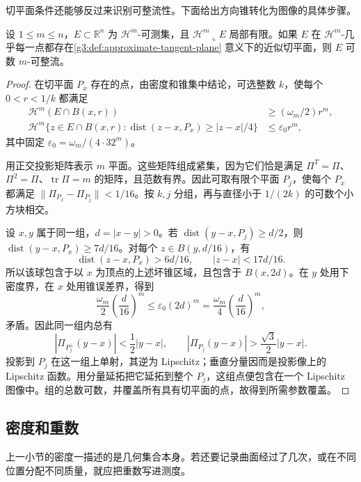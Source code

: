 切平面条件还能够反过来识别可整流性。下面给出方向锥转化为图像的具体步骤。

\begin{theorem}\label{g3:thm:tangent-rectifiability-criterion}
	设 \(1\le m\le n\)，\(E\subset\mathbb R^n\) 为 \(\mathcal H^m\)-可测集，且 \(\mathcal H^m\llcorner E\) 局部有限。如果 \(E\) 在 \(\mathcal H^m\)-几乎每一点都存在\cref{g3:def:approximate-tangent-plane} 意义下的近似切平面，则 \(E\) 可数 \(m\)-可整流。
\end{theorem}
\begin{proof}
	在切平面 \(P_x\) 存在的点，由密度和锥集中结论，可选整数 \(k\)，使每个 \(0<r<1/k\) 都满足
	\begin{align*}
		\mathcal H^m(E\cap B(x,r))&\ge(\omega_m/2)r^m,\\
		\mathcal H^m\{z\in E\cap B(x,r):
		\operatorname{dist}(z-x,P_x)\ge |z-x|/4\}&\le\varepsilon_0r^m,
	\end{align*}
	其中固定 \(\varepsilon_0=\omega_m/(4\cdot32^m)\)。

	用正交投影矩阵表示 \(m\) 平面。这些矩阵组成紧集，因为它们恰是满足
	\(\Pi^T=\Pi\)、\(\Pi^2=\Pi\)、\(\operatorname{tr}\Pi=m\) 的矩阵，且范数有界。因此可取有限个平面 \(P_j\)，使每个 \(P_x\) 都满足
	\(\|\Pi_{P_x}-\Pi_{P_j}\|<1/16\)。按 \(k,j\) 分组，再与直径小于 \(1/(2k)\) 的可数个小方块相交。

	设 \(x,y\) 属于同一组，\(d=|x-y|>0\)。若
	\(\operatorname{dist}(y-x,P_j)\ge d/2\)，则
	\(\operatorname{dist}(y-x,P_x)\ge7d/16\)。对每个 \(z\in B(y,d/16)\)，有
	\[
		\operatorname{dist}(z-x,P_x)>6d/16,\qquad
		|z-x|<17d/16.
	\]
	所以该球包含于以 \(x\) 为顶点的上述坏锥区域，且包含于 \(B(x,2d)\)。在 \(y\) 处用下密度界，在 \(x\) 处用锥误差界，得到
	\[
		\frac{\omega_m}{2}\left(\frac d{16}\right)^m
		\le\varepsilon_0(2d)^m
		=\frac{\omega_m}{4}\left(\frac d{16}\right)^m,
	\]
	矛盾。因此同一组内总有
	\[
		|\Pi_{P_j^\perp}(y-x)|<\frac12|y-x|,
		\qquad
		|\Pi_{P_j}(y-x)|>\frac{\sqrt3}{2}|y-x|.
	\]
	投影到 \(P_j\) 在这一组上单射，其逆为 Lipschitz；垂直分量因而是投影像上的 Lipschitz 函数。用分量延拓把它延拓到整个 \(P_j\)，这组点便包含在一个 Lipschitz 图像中。组的总数可数，并覆盖所有具有切平面的点，故得到所需参数覆盖。
\end{proof}

\subsection{密度和重数}
\label{g3:subsec:2005:03}
上一小节的密度一描述的是几何集合本身。若还要记录曲面经过了几次，或在不同位置分配不同质量，就应把重数写进测度。


